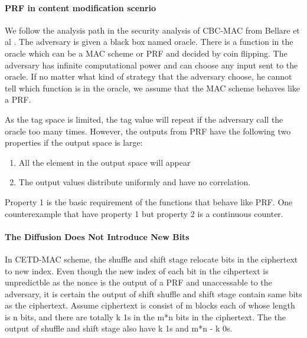 \paragraph{PRF in content modification scenrio}
We follow the analysis path in the security analysis of CBC-MAC from Bellare et
al \cite{}. The adversary is given a black box named oracle. There is a function
in the oracle which can be a MAC scheme or PRF and decided by coin flipping. The adversary has infinite
computational power and can choose any input sent to the oracle. If no matter
what kind of strategy that the adversary choose, he cannot tell which function
is in the oracle, we assume that the MAC scheme behaves like a PRF.  

As the tag space is limited, the tag value will repeat if the adversary call the
oracle too many times. However, the outputs from PRF have the following two
properties if the output space is large:
\begin{enumerate}
	\item All the element in the output space will appear
	\item The output values distribute uniformly and have no correlation. 
\end{enumerate}
Property 1 is the basic requirement of the functions that behave like PRF. One
counterexample that have property 1 but property 2 is a continuous counter.


\paragraph{The Diffusion Does Not Introduce New Bits}
In CETD-MAC scheme, the shuffle and shift stage relocate bits in the ciphertext to new index. Even though the new index of each bit in the cihpertext is unpredictble as the nonce is the output of a PRF and unaccessable to the adversary, it is certain the output of shift shuffle and shift stage contain same bits as the ciphertext. Assume ciphertext is consist of m blocks each of whose length is n bits, and there are totally k 1s in the m*n bits in the ciphertext. The the output of shuffle and shift stage also have k 1s and m*n - k 0s. 

